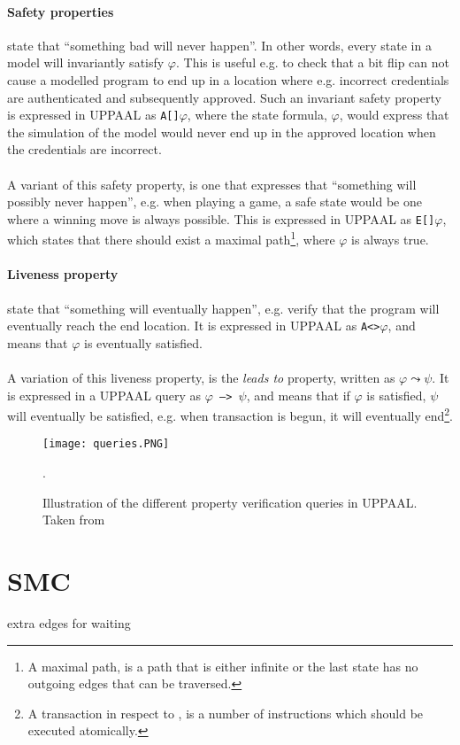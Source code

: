 \paragraph{Safety properties} state that ``something bad will never happen''. In other words, every state in a model will invariantly satisfy $\varphi$. This is useful e.g. to check that a bit flip can not cause a modelled program to end up in a location where e.g. incorrect credentials are authenticated and subsequently approved. Such an invariant safety property is expressed in UPPAAL as \texttt{A[]$\varphi$}, where the state formula, $\varphi$, would express that the simulation of the model would never end up in the approved location when the credentials are incorrect.\\\\
A variant of this safety property, is one that expresses that ``something will possibly never happen'', e.g. when playing a game, a safe state would be one where a winning move is always possible. This is expressed in UPPAAL as \texttt{E[]$\varphi$}, which states that there should exist a maximal path\footnote{A maximal path, is a path that is either infinite or the last state has no outgoing edges that can be traversed.}, where $\varphi$ is always true.
\paragraph{Liveness property} state that ``something will eventually happen'', e.g. verify that the program will eventually reach the end location. It is expressed in UPPAAL as \texttt{A<>$\varphi$}, and means that $\varphi$ is eventually satisfied.\\\\
A variation of this liveness property, is the \textit{leads to} property, written as $\varphi \leadsto \psi$. It is expressed in a UPPAAL query as \texttt{$\varphi$ --> $\psi$}, and means that if $\varphi$ is satisfied, $\psi$ will eventually be satisfied, e.g. when \jc transaction is begun, it will eventually end\footnote{A transaction in respect to \jc, is a number of instructions which should be executed atomically.}.

\begin{figure}[H]
\centering
\texttt{[image: queries.PNG]}
\caption{Illustration of the different property verification queries in UPPAAL. Taken from \cite[p. 8]{upptut}}.
\label{fig:query}
\end{figure}

\section{SMC}
extra edges for waiting
